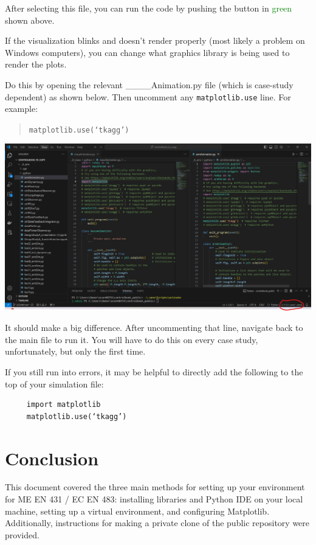 \documentclass{article}
\begin{document}
After selecting this file, you can run the code by pushing the button in \textcolor{green}{green} shown above.


If the visualization blinks and doesn’t render properly (most likely a problem on Windows computers), you can change what graphics library is being used to render the plots. 

Do this by opening the relevant \_\_\_\_Animation.py file (which is case-study dependent) as shown below. Then uncomment any \texttt{matplotlib.use} line. For example:

\begin{quote}
\texttt{matplotlib.use(‘tkagg’)}
\end{quote}

\begin{center}
    \includegraphics[width=\linewidth]{pic8-final.png} 
\end{center}

 It should make a big difference. After uncommenting that line, navigate back to the main file to run it. You will have to do this on every case study, unfortunately, but only the first time.

 If you still run into errors, it may be helpful to directly add the following to the top of your simulation file:

 \begin{verbatim}
     import matplotlib
     matplotlib.use(‘tkagg’)
 \end{verbatim}




\section{Conclusion}
This document covered the three main methods for setting up your environment for ME EN 431 / EC EN 483: installing libraries and Python IDE on your local machine, setting up a virtual environment, and configuring Matplotlib. Additionally, instructions for making a private clone of the public repository were provided.
\end{document}
